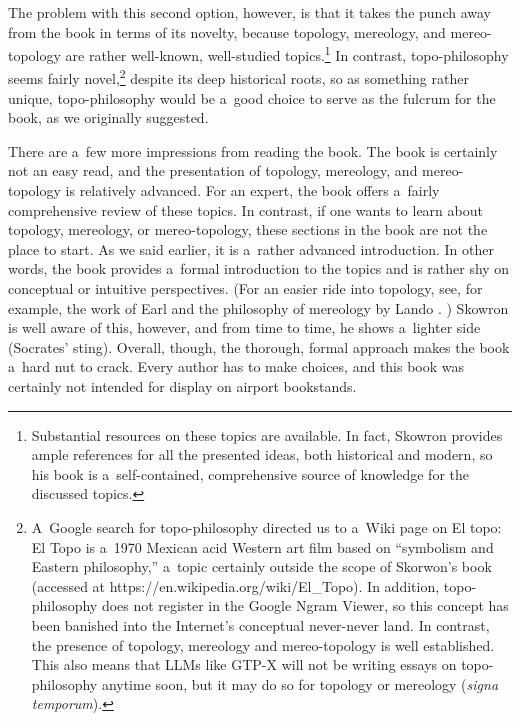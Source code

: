The problem with this second option, however, is that it takes the punch away from the book in terms of its novelty, because topology, mereology, and mereo-topology are rather well-known, well-studied topics.\footnote{Substantial resources on these topics are available. In fact, Skowron provides ample references for all the presented ideas, both historical and modern, so his book is a~self-contained, comprehensive source of knowledge for the discussed topics.} In contrast, topo-philosophy seems fairly novel,\footnote{A~Google search for topo-philosophy directed us to a~Wiki page on El topo: El Topo is a~1970 Mexican acid Western art film based on ``symbolism and Eastern philosophy,'' a~topic certainly outside the scope of Skorwon's book (accessed at https://en.wikipedia.org/wiki/El\_Topo). In addition, topo-philosophy does not register in the Google Ngram Viewer, so this concept has been banished into the Internet's conceptual never-never land. In contrast, the presence of topology, mereology and mereo-topology is well established. This also means that LLMs like GTP-X will not be writing essays on topo-philosophy anytime soon, but it may do so for topology or mereology (\textit{signa temporum}).} despite its deep historical roots, so as something rather unique, topo-philosophy would be a~good choice to serve as the fulcrum for the book, as we originally suggested.



There are a~few more impressions from reading the book. The book is certainly not an easy read, and the presentation of topology, mereology, and mereo-topology is relatively advanced. For an expert, the book offers a~fairly comprehensive review of these topics. In contrast, if one wants to learn about topology, mereology, or mereo-topology, these sections in the book are not the place to start. As we said earlier, it is a~rather advanced introduction. In other words, the book provides a~formal introduction to the topics and is rather shy on conceptual or intuitive perspectives. (For an easier ride into topology, see, for example, the work of Earl 
\parencite*[][]{earl_topology_2019} %
 and the philosophy of mereology by Lando 
\parencite*[][]{lando_mereology_2017}.%
) Skowron is well aware of this, however, and from time to time, he shows a~lighter side (Socrates' sting). Overall, though, the thorough, formal approach makes the book a~hard nut to crack. Every author has to make choices, and this book was certainly not intended for display on airport bookstands.



